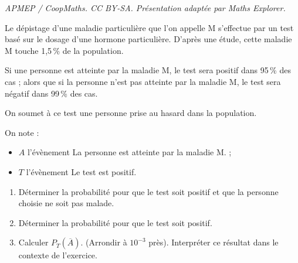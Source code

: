 \documentclass[10pt]{article}
\begin{document}
\noindent\textit{APMEP / CoopMaths. CC BY-SA. Présentation adaptée par Maths Explorer.}\par\medskip
\medskip

Le dépistage d'une maladie particulière que l'on appelle M s'effectue par un test basé sur le dosage d'une hormone particulière. D'après une étude, cette maladie M touche 1,5\,\% de la population.

Si une personne est atteinte par la maladie M, le test sera positif dans 95\,\% des cas ; alors que si la personne n'est pas atteinte par la maladie M, le test sera négatif dans 99\,\% des cas.

On soumet à ce test une personne prise au hasard dans la population.

On note :

\begin{itemize}
\item $A$ l'évènement \og La personne est atteinte par la maladie M.\fg{} ;
\item $T$ l'évènement \og Le test est positif\fg.
\end{itemize}
\begin{enumerate}
\item Déterminer la probabilité pour que le test soit positif et que la personne choisie ne soit pas malade.
\item Déterminer la probabilité pour que le test soit positif.
\item Calculer $P_T\left(\overline{A}\right)$. (Arrondir à $10^{-3}$ près). Interpréter ce résultat dans le contexte de l'exercice.
\end{enumerate}

\vspace{0,5cm}
\end{document}
